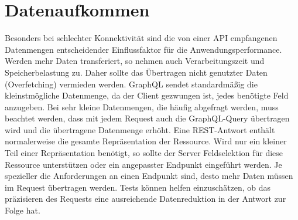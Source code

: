 \section{Datenaufkommen}
Besonders bei schlechter Konnektivität sind die von einer API empfangenen Datenmengen entscheidender Einflussfaktor für die Anwendungsperformance.
Werden mehr Daten transferiert, so nehmen auch Verarbeitungszeit und Speicherbelastung zu.
Daher sollte das Übertragen nicht genutzter Daten (Overfetching) vermieden werden.
GraphQL sendet standardmäßig die kleinstmögliche Datenmenge, da der Client gezwungen ist, jedes benötigte Feld anzugeben.
Bei sehr kleine Datenmengen, die häufig abgefragt werden, muss beachtet werden, dass mit jedem Request auch die GraphQL-Query übertragen wird und die übertragene Datenmenge erhöht.
Eine REST-Antwort enthält normalerweise die gesamte Repräsentation der Ressource.
Wird nur ein kleiner Teil einer Repräsentation benötigt, so sollte der Server Feldselektion für diese Ressource unterstützen oder ein angepasster Endpunkt eingeführt werden.
Je spezieller die Anforderungen an einen Endpunkt sind, desto mehr Daten müssen im Request übertragen werden.
Tests können helfen einzuschätzen, ob das präzisieren des Requests eine ausreichende Datenreduktion in der Antwort zur Folge hat.

